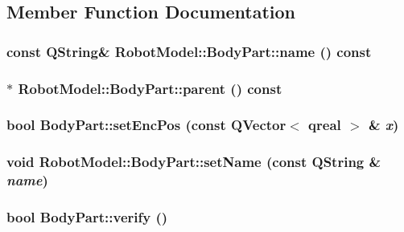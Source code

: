 \subsection{Member Function Documentation}
\hypertarget{class_robot_model_1_1_body_part_a61b6e309edb55f764400dac2b8659a5f}{
\subsubsection[{name}]{\setlength{\rightskip}{0pt plus 5cm}const QString\& RobotModel::BodyPart::name () const}}
\label{class_robot_model_1_1_body_part_a61b6e309edb55f764400dac2b8659a5f}
\hypertarget{class_robot_model_1_1_body_part_abc2ab2a0e1da50aa7465bc1b92ed3abc}{
\subsubsection[{parent}]{$\ast$ RobotModel::BodyPart::parent () const}}
\label{class_robot_model_1_1_body_part_abc2ab2a0e1da50aa7465bc1b92ed3abc}
\hypertarget{class_robot_model_1_1_body_part_adc934dcfdac5a14fe88dd5a21b9055d7}{
\subsubsection[{setEncPos}]{\setlength{\rightskip}{0pt plus 5cm}bool BodyPart::setEncPos (const QVector$<$ qreal $>$ \& {\em x})}}
\label{class_robot_model_1_1_body_part_adc934dcfdac5a14fe88dd5a21b9055d7}
\hypertarget{class_robot_model_1_1_body_part_ae67c833c817776f9b922d967a2654df2}{
\subsubsection[{setName}]{\setlength{\rightskip}{0pt plus 5cm}void RobotModel::BodyPart::setName (const QString \& {\em name})}}
\label{class_robot_model_1_1_body_part_ae67c833c817776f9b922d967a2654df2}
\hypertarget{class_robot_model_1_1_body_part_a6b52676f58b9da5bef87ef2fac1a7a94}{
\subsubsection[{verify}]{\setlength{\rightskip}{0pt plus 5cm}bool BodyPart::verify ()}}
\label{class_robot_model_1_1_body_part_a6b52676f58b9da5bef87ef2fac1a7a94}


